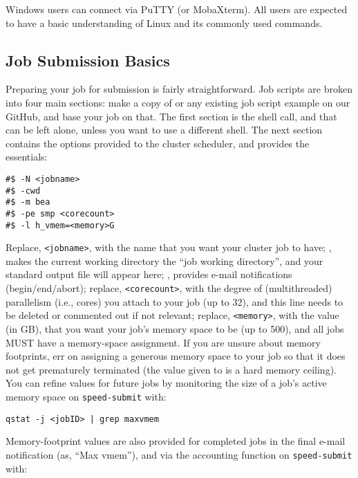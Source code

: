 \documentclass{easychair}
\begin{document}
Windows users can connect via PuTTY (or MobaXterm). All users are expected
to have a basic understanding of Linux and its commonly used commands.

\subsection{Job Submission Basics}

Preparing your job for submission is fairly straightforward. Job scripts
are broken into four main sections: make a copy of 
or any existing job script example on our GitHub, and base
your job on that. The first section is the shell call, and that can be
left alone, unless you want to use a different shell. The next section
contains the options provided to the cluster scheduler, and 
provides the essentials:

\begin{verbatim}
#$ -N <jobname>
#$ -cwd
#$ -m bea
#$ -pe smp <corecount>
#$ -l h_vmem=<memory>G
\end{verbatim}

Replace, \verb+<jobname>+, with the name that you want your cluster job to have;
, makes the current working directory the ``job working directory'',
and your standard output file will appear here; , provides e-mail
notifications (begin/end/abort); replace, \verb+<corecount>+, with the degree of
(multithreaded) parallelism (i.e., cores) you attach to your job (up to
32), and this line needs to be deleted or commented out if not relevant;
replace, \verb+<memory>+, with the value (in GB), that you want your job's memory
space to be (up to 500), and all jobs MUST have a memory-space assignment.
If you are unsure about memory footprints, err on assigning a generous
memory space to your job so that it does not get prematurely terminated
(the value given to  is a hard memory ceiling). You can refine
 values for future jobs by monitoring the size of a job's active
memory space on \texttt{speed-submit} with:

\begin{verbatim}
qstat -j <jobID> | grep maxvmem
\end{verbatim}

Memory-footprint values are also provided for completed jobs in the final
e-mail notification (as, ``Max vmem''), and via the accounting function on
\texttt{speed-submit} with:
\end{document}

